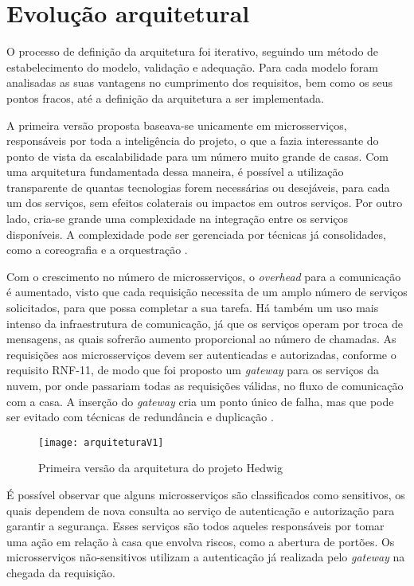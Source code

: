 \section{Evolução arquitetural}
O processo de definição da arquitetura foi iterativo, seguindo um método de estabelecimento do modelo, validação e adequação. Para cada modelo foram analisadas as suas vantagens no cumprimento dos requisitos, bem como os seus pontos fracos, até a definição da arquitetura a ser implementada.

A primeira versão proposta baseava-se unicamente em microsserviços, responsáveis por toda a inteligência do projeto, o que a fazia interessante do ponto de vista da escalabilidade para um número muito grande de casas. Com uma arquitetura fundamentada dessa maneira, é possível a utilização transparente de quantas tecnologias forem necessárias ou desejáveis, para cada um dos serviços, sem efeitos colaterais ou impactos em outros serviços. Por outro lado, cria-se grande uma complexidade na integração entre os serviços disponíveis. A complexidade pode ser gerenciada por técnicas já consolidades, como a coreografia e a orquestração \cite{lewis}.

Com o crescimento no número de microsserviços, o \emph{overhead} para a comunicação é aumentado, visto que cada requisição necessita de um amplo número de serviços solicitados, para que possa completar a sua tarefa. Há também um uso mais intenso da infraestrutura de comunicação, já que os serviços operam por troca de mensagens, as quais sofrerão aumento proporcional ao número de chamadas. As requisições aos microsserviços devem ser autenticadas e autorizadas, conforme o requisito RNF-11, de modo que foi proposto um \emph{gateway} para os serviços da nuvem, por onde passariam todas as requisições válidas, no fluxo de comunicação com a casa. A inserção do \emph{gateway} cria um ponto único de falha, mas que pode ser evitado com técnicas de redundância e duplicação \cite{oracleSPOF}.

\begin{figure}[H]
	\centering
	\caption{Primeira versão da arquitetura do projeto Hedwig}
  \texttt{[image: arquiteturaV1]}
\label{fig:arquiteturaV1}
\end{figure}

É possível observar que alguns microsserviços são classificados como sensitivos, os quais dependem de nova consulta ao serviço de autenticação e autorização para garantir a segurança. Esses serviços são todos aqueles responsáveis por tomar uma ação em relação à casa que envolva riscos, como a abertura de portões. Os microsserviços não-sensitivos utilizam a autenticação já realizada pelo \textit{gateway} na chegada da requisição.

